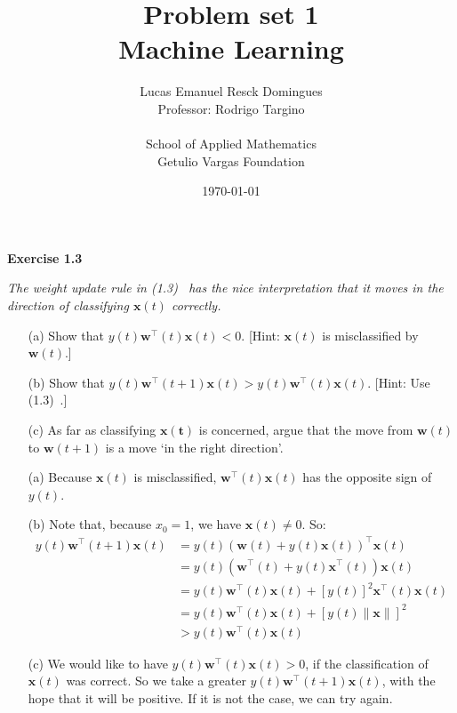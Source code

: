 \documentclass{article}
\title{Problem set 1\\
    \large{Machine Learning}}
\author{Lucas Emanuel Resck Domingues\\    
    Professor: Rodrigo Targino\\\\
    {School of Applied Mathematics}\\
    {Getulio Vargas Foundation}}
\date{\today}
\begin{document}
    \maketitle

    \noindent \textbf{Exercise 1.3}

    \noindent \textit{The weight update rule in (1.3)~\cite{yaser2012learning} has the nice interpretation that it moves in the direction of classifying $\mathbf{x}(t)$ correctly.}
    \begin{itemize}[before=\itshape]
        \item[(a)] Show that $y(t) \mathbf{w}^\intercal(t) \mathbf{x}(t) < 0$. [Hint: $\mathbf{x}(t)$ is misclassified by $\mathbf{w}(t)$.]
        \item[(b)] Show that $y(t) \mathbf{w}^\intercal(t + 1) \mathbf{x}(t) > y(t) \mathbf{w}^\intercal(t) \mathbf{x}(t)$. [Hint: Use (1.3)~\cite{yaser2012learning}.]
        \item[(c)] As far as classifying $\mathbf{x(t)}$ is concerned, argue that the move from $\mathbf{w}(t)$ to $\mathbf{w}(t + 1)$ is a move `in the right direction'.
    \end{itemize}

    \begin{itemize}
        \item[(a)] Because $\mathbf{x}(t)$ is misclassified, $\mathbf{w}^\intercal(t) \mathbf{x}(t)$ has the opposite sign of $y(t)$.
        \item[(b)] Note that, because $x_0 = 1$, we have $\mathbf{x}(t) \ne 0$.
            So:
            \begin{align*}
                y(t) \mathbf{w}^\intercal(t + 1) \mathbf{x}(t) &= y(t) (\mathbf{w}(t) + y(t) \mathbf{x}(t))^\intercal \mathbf{x}(t) \\
                &= y(t) (\mathbf{w}^\intercal(t) + y(t) \mathbf{x}^\intercal(t)) \mathbf{x}(t) \\
                &= y(t) \mathbf{w}^\intercal(t) \mathbf{x}(t) + [y(t)]^2 \mathbf{x}^\intercal(t) \mathbf{x}(t)  \\
                &= y(t) \mathbf{w}^\intercal(t) \mathbf{x}(t) + [y(t) \lVert\mathbf{x}\lVert]^2 \\
                &> y(t) \mathbf{w}^\intercal(t) \mathbf{x}(t)
            \end{align*}
        \item[(c)] We would like to have $y(t) \mathbf{w}^\intercal(t) \mathbf{x}(t) > 0$, if the classification of $\mathbf{x}(t)$ was correct.
            So we take a greater $y(t) \mathbf{w}^\intercal(t + 1) \mathbf{x}(t)$, with the hope that it will be positive.
            If it is not the case, we can try again.
    \end{itemize}
\end{document}
